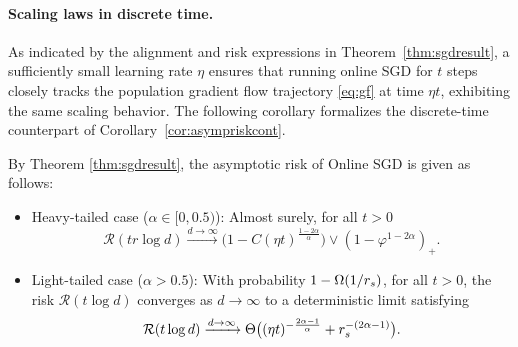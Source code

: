 \paragraph{Scaling laws in discrete time.} As indicated by the alignment and risk expressions in Theorem~\ref{thm:sgdresult}, a sufficiently small learning rate $\eta$ ensures that running online SGD for $t$ steps closely tracks the population gradient flow trajectory \eqref{eq:gf} at time $\eta t$, exhibiting the same scaling behavior. The following corollary formalizes the discrete-time counterpart of Corollary~\ref{cor:asympriskcont}.


\begin{corollary}
\label{cor:asympriskdis}
By Theorem \ref{thm:sgdresult}, the asymptotic risk of Online SGD is given as follows:
\begin{itemize}[leftmargin = *,noitemsep]
    \item   Heavy-tailed case ($\alpha \in [0,0.5)$): Almost surely, for all $t > 0$
    $$\mathcal{R}(t r \log d)
    \xrightarrow
    {d \to \infty}
    \big(1 - C (\eta t)^{\frac{1 - 2 \alpha}{\alpha}}  \big)  \vee (1 - \varphi^{1 - 2\alpha})_+.$$ 
    \item Light-tailed case ($\alpha > 0.5$): With probability  $1 - \Omega(1/r_s)$, for all $t > 0$, the risk $\mathcal{R}(t \log d)$ converges as $d \to \infty$ to a deterministic limit satisfying
    $$\mathcal{R}(t \log d)
    \xrightarrow{d \to \infty}
    \Theta  \big(   (\eta t)^{- \frac{2 \alpha - 1}{\alpha}} + r_s^{- (2 \alpha  - 1)}  \big).$$
\end{itemize}
\end{corollary}
 


